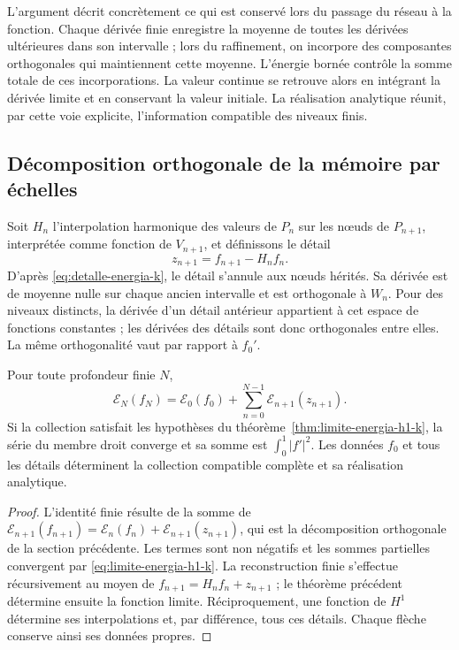 L’argument décrit concrètement ce qui est conservé lors du passage du réseau
à la fonction. Chaque dérivée finie enregistre la moyenne de toutes les
dérivées ultérieures dans son intervalle ; lors du raffinement, on incorpore des
composantes orthogonales qui maintiennent cette moyenne. L’énergie bornée
contrôle la somme totale de ces incorporations. La valeur continue se
retrouve alors en intégrant la dérivée limite et en conservant la valeur
initiale. La réalisation analytique réunit, par cette voie explicite,
l’information compatible des niveaux finis.

\subsection{Décomposition orthogonale de la mémoire par échelles}

Soit \(H_n\) l’interpolation harmonique des valeurs de \(P_n\)
sur les nœuds de \(P_{n+1}\), interprétée comme fonction de
\(V_{n+1}\), et définissons le détail
\[
 z_{n+1}=f_{n+1}-H_nf_n.
\]
D'après \eqref{eq:detalle-energia-k}, le détail s'annule aux nœuds hérités. Sa dérivée est de moyenne nulle sur chaque ancien intervalle et est orthogonale à \(W_n\). Pour des niveaux distincts, la dérivée d'un détail antérieur appartient à cet espace de fonctions constantes ; les dérivées des détails sont donc orthogonales entre elles. La même orthogonalité vaut par rapport à \(f_0'\).

\begin{proposition}
\label{prop:memoria-energetica-escalas-k}
Pour toute profondeur finie \(N\),
\begin{equation}
 \mathcal E_N(f_N)
 =\mathcal E_0(f_0)
 +\sum_{n=0}^{N-1}\mathcal E_{n+1}(z_{n+1}).
 \label{eq:energia-telescopica-detalles-k}
\end{equation}
Si la collection satisfait les hypothèses du théorème~\ref{thm:limite-energia-h1-k}, la série du membre droit converge et sa somme est \(\int_0^1|f'|^2\). Les données \(f_0\) et tous les détails déterminent la collection compatible complète et sa réalisation analytique.
\end{proposition}
\begin{proof}
L’identité finie résulte de la somme de
\(\mathcal E_{n+1}(f_{n+1})
=\mathcal E_n(f_n)+\mathcal E_{n+1}(z_{n+1})\), qui est la
décomposition orthogonale de la section précédente. Les termes sont
non négatifs et les sommes partielles convergent par
\eqref{eq:limite-energia-h1-k}. La reconstruction finie s’effectue
récursivement au moyen de \(f_{n+1}=H_nf_n+z_{n+1}\) ; le théorème
précédent détermine ensuite la fonction limite. Réciproquement, une
fonction de \(H^1\) détermine ses interpolations et, par différence,
tous ces détails. Chaque flèche conserve ainsi ses données propres.
\end{proof}


